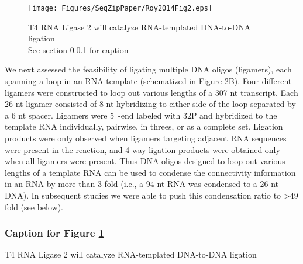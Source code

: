 		\begin{figure} %
			\centering 
			\texttt{[image: Figures/SeqZipPaper/Roy2014Fig2.eps]}
			\caption[T4 RNA Ligase 2 will catalyze RNA-templated DNA-to-DNA ligation]
			{
				T4 RNA Ligase 2 will catalyze RNA-templated DNA-to-DNA ligation \\[0.25cm]
				See section \ref{SeqZipPaper:figCap: Roy2014 F2} for caption
				}
			\label{SeqZipPaper:fig:Roy2014 F2}
			\end{figure}

		We next assessed the feasibility of ligating multiple DNA oligos (ligamers), each spanning a loop in an RNA template (schematized in Figure-2B). Four different ligamers were constructed to loop out various lengths of a 307 nt transcript. Each 26 nt ligamer consisted of 8 nt hybridizing to either side of the loop separated by a 6 nt spacer. Ligamers were 5\textprime~-end labeled with 32P and hybridized to the template RNA individually, pairwise, in threes, or as a complete set. Ligation products were only observed when ligamers targeting adjacent RNA sequences were present in the reaction, and 4-way ligation products were obtained only when all ligamers were present. Thus DNA oligos designed to loop out various lengths of a template RNA can be used to condense the connectivity information in an RNA by more than 3 fold (i.e., a 94 nt RNA was condensed to a 26 nt DNA). In subsequent studies we were able to push this condensation ratio to >49 fold (see below).

		\subsubsection{Caption for Figure \ref{SeqZipPaper:fig:Roy2014 F2}}
			\label{SeqZipPaper:figCap: Roy2014 F2}

			T4 RNA Ligase 2 will catalyze RNA-templated DNA-to-DNA ligation


